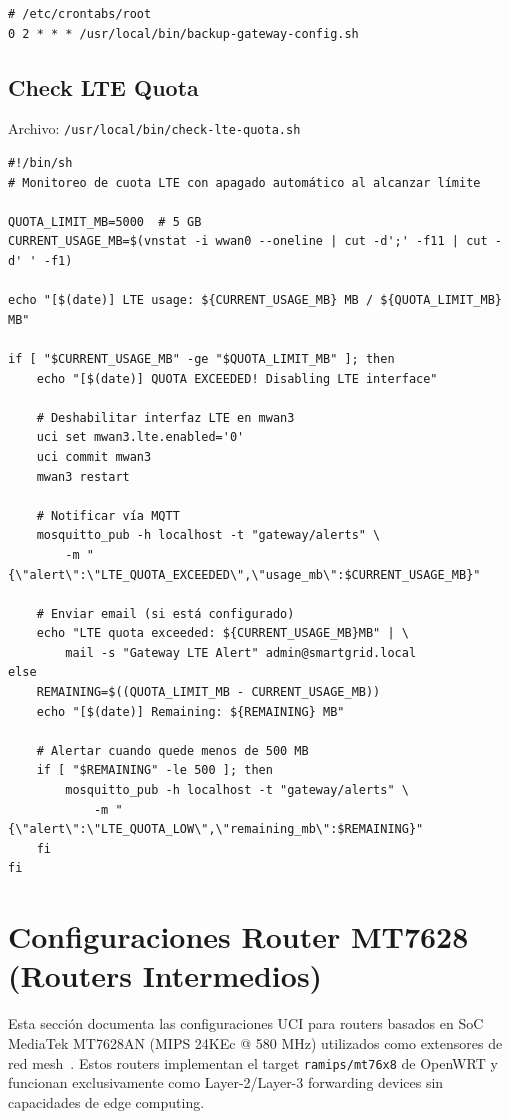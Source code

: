\begin{verbatim}
# /etc/crontabs/root
0 2 * * * /usr/local/bin/backup-gateway-config.sh
\end{verbatim}

\subsection{Check LTE Quota}

Archivo: \texttt{/usr/local/bin/check-lte-quota.sh}

\begin{verbatim}
#!/bin/sh
# Monitoreo de cuota LTE con apagado automático al alcanzar límite

QUOTA_LIMIT_MB=5000  # 5 GB
CURRENT_USAGE_MB=$(vnstat -i wwan0 --oneline | cut -d';' -f11 | cut -d' ' -f1)

echo "[$(date)] LTE usage: ${CURRENT_USAGE_MB} MB / ${QUOTA_LIMIT_MB} MB"

if [ "$CURRENT_USAGE_MB" -ge "$QUOTA_LIMIT_MB" ]; then
    echo "[$(date)] QUOTA EXCEEDED! Disabling LTE interface"
    
    # Deshabilitar interfaz LTE en mwan3
    uci set mwan3.lte.enabled='0'
    uci commit mwan3
    mwan3 restart
    
    # Notificar vía MQTT
    mosquitto_pub -h localhost -t "gateway/alerts" \
        -m "{\"alert\":\"LTE_QUOTA_EXCEEDED\",\"usage_mb\":$CURRENT_USAGE_MB}"
    
    # Enviar email (si está configurado)
    echo "LTE quota exceeded: ${CURRENT_USAGE_MB}MB" | \
        mail -s "Gateway LTE Alert" admin@smartgrid.local
else
    REMAINING=$((QUOTA_LIMIT_MB - CURRENT_USAGE_MB))
    echo "[$(date)] Remaining: ${REMAINING} MB"
    
    # Alertar cuando quede menos de 500 MB
    if [ "$REMAINING" -le 500 ]; then
        mosquitto_pub -h localhost -t "gateway/alerts" \
            -m "{\"alert\":\"LTE_QUOTA_LOW\",\"remaining_mb\":$REMAINING}"
    fi
fi
\end{verbatim}

\section{Configuraciones Router MT7628 (Routers Intermedios)}

Esta sección documenta las configuraciones UCI para routers basados en SoC MediaTek MT7628AN (MIPS 24KEc @ 580 MHz) utilizados como extensores de red mesh~\cite{morsemicroOpenWRT2024}. Estos routers implementan el target \texttt{ramips/mt76x8} de OpenWRT y funcionan exclusivamente como Layer-2/Layer-3 forwarding devices sin capacidades de edge computing.

